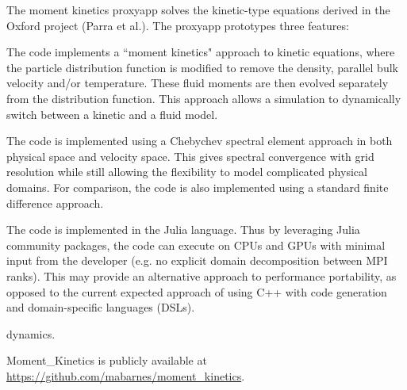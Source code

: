
The moment kinetics proxyapp solves the kinetic-type equations derived in the 
Oxford project (Parra et al.). The proxyapp prototypes three features:

The code implements a ``moment kinetics" approach to kinetic equations, where 
the particle distribution function is modified to remove the density, parallel 
bulk velocity and/or temperature. These fluid moments are then evolved 
separately from the distribution function. This approach allows a simulation to 
dynamically switch between a kinetic and a fluid model.

The code is implemented using a Chebychev spectral element approach in both 
physical space and velocity space. This gives spectral convergence with grid 
resolution while still allowing the flexibility to model complicated physical 
domains. For comparison, the code is also implemented using a standard finite 
difference approach.

The code is implemented in the Julia language. Thus by leveraging Julia 
community packages, the code can execute on CPUs and GPUs with minimal input 
from the developer (e.g. no explicit domain decomposition between MPI ranks). 
This may provide an alternative approach to performance portability, as opposed 
to the current expected approach of using C++ with code generation and 
domain-specific languages (DSLs).

dynamics.

Moment\_Kinetics is publicly available at 
\url{https://github.com/mabarnes/moment_kinetics}.
